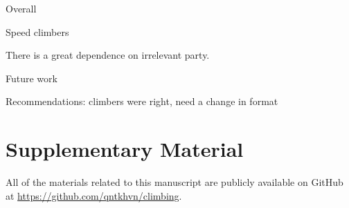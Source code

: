 \documentclass[12pt]{article}
\begin{document}
Overall

Speed climbers

There is a great dependence on irrelevant party.

Future work

Recommendations: climbers were right, need a change in format

\hypertarget{supplementary-material}{%
\section*{Supplementary Material}\label{supplementary-material}}

All of the materials related to this manuscript are publicly available
on GitHub at \newline \url{https://github.com/qntkhvn/climbing}.

\begin{table}[H]

\caption{\label{tab:unnamed-chunk-28}This table shows Kendall's rank correlation coefficients between the overall and individual discipline ranks for men's and women's sport climbing qualifications at the 2018 Asian Games}
\centering
{}
\end{table}
\end{document}
